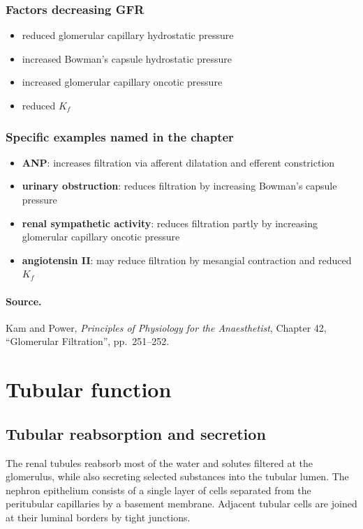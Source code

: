 \documentclass[11pt,a4paper]{article}
\begin{document}
\subsubsection{Factors decreasing GFR}
\begin{itemize}
    \item reduced glomerular capillary hydrostatic pressure
    \item increased Bowman’s capsule hydrostatic pressure
    \item increased glomerular capillary oncotic pressure
    \item reduced \(K_f\)
\end{itemize}

\subsubsection{Specific examples named in the chapter}
\begin{itemize}
    \item \textbf{ANP}: increases filtration via afferent dilatation and efferent constriction
    \item \textbf{urinary obstruction}: reduces filtration by increasing Bowman’s capsule pressure
    \item \textbf{renal sympathetic activity}: reduces filtration partly by increasing glomerular capillary oncotic pressure
    \item \textbf{angiotensin II}: may reduce filtration by mesangial contraction and reduced \(K_f\)
\end{itemize}

\paragraph{Source.}
Kam and Power, \textit{Principles of Physiology for the Anaesthetist}, Chapter 42, ``Glomerular Filtration'', pp.\ 251--252.

\section{Tubular function}

\subsection{Tubular reabsorption and secretion}

The renal tubules reabsorb most of the water and solutes filtered at the glomerulus, while also secreting selected substances into the tubular lumen. The nephron epithelium consists of a single layer of cells separated from the peritubular capillaries by a basement membrane. Adjacent tubular cells are joined at their luminal borders by tight junctions.
\end{document}
